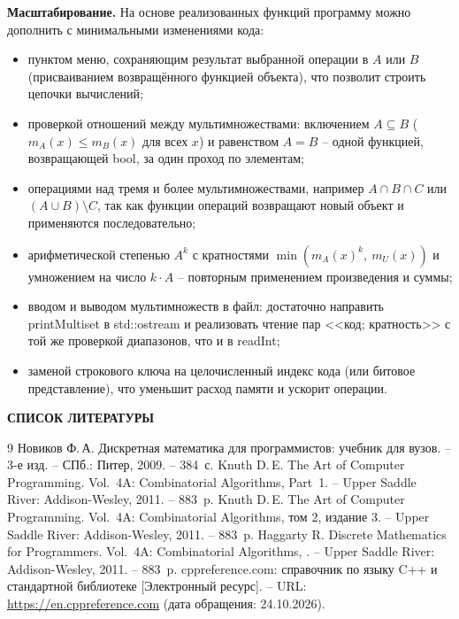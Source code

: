 \documentclass[14pt,a4paper]{extreport}
\newcommand{\structhead}[2]{%
  \clearpage\phantomsection
  \begin{center}\normalfont\bfseries\fontsize{14}{16}\selectfont #1\end{center}\vspace{6pt}
  \addcontentsline{toc}{section}{#2}}
\newcommand{\mult}[2]{m_{#1}(#2)}
\newcommand{\code}[1]{{\ttfamily #1}}
\begin{document}
\textbf{Масштабирование.} На основе реализованных функций программу можно дополнить с минимальными изменениями кода:
\begin{itemize}
\item пунктом меню, сохраняющим результат выбранной операции в $A$ или $B$ (присваиванием возвращённого функцией объекта), что позволит строить цепочки вычислений;
\item проверкой отношений между мультимножествами: включением $A\subseteq B$ ($\mult{A}{x}\le\mult{B}{x}$ для всех $x$) и равенством $A=B$ -- одной функцией, возвращающей \code{bool}, за один проход по элементам;
\item операциями над тремя и более мультимножествами, например $A\cap B\cap C$ или $(A\cup B)\setminus C$, так как функции операций возвращают новый объект и применяются последовательно;
\item арифметической степенью $A^k$ с кратностями $\min(\mult{A}{x}^k,\ \mult{U}{x})$ и умножением на число $k\cdot A$ -- повторным применением произведения и суммы;
\item вводом и выводом мультимножеств в файл: достаточно направить \code{printMultiset} в \code{std::ostream} и реализовать чтение пар <<код; кратность>> с той же проверкой диапазонов, что и в \code{readInt};
\item заменой строкового ключа на целочисленный индекс кода (или битовое представление), что уменьшит расход памяти и ускорит операции.
\end{itemize}

\structhead{СПИСОК ЛИТЕРАТУРЫ}{Список литературы}
\begin{thebibliography}{9}
 Новиков Ф.\,А. Дискретная математика для программистов: учебник для вузов. -- 3-е изд. -- СПб.: Питер, 2009. -- 384~с.
 Knuth D.\,E. The Art of Computer Programming. Vol.~4A: Combinatorial Algorithms, Part~1. -- Upper Saddle River: Addison-Wesley, 2011. -- 883~p.
 Knuth D.\,E. The Art of Computer Programming. Vol.~4A: Combinatorial Algorithms, том 2, издание 3. -- Upper Saddle River: Addison-Wesley, 2011. -- 883~p.
 Haggarty R. Discrete Mathematics for Programmers. Vol.~4A: Combinatorial Algorithms, . -- Upper Saddle River: Addison-Wesley, 2011. -- 883~p.
 cppreference.com: справочник по языку C++ и стандартной библиотеке [Электронный ресурс]. -- URL: \url{https://en.cppreference.com} (дата обращения: 24.10.2026).
\end{thebibliography}
\end{document}
